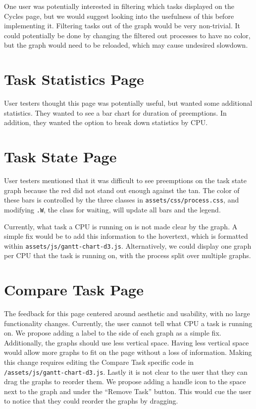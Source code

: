 \documentclass{hmcclinic}
\begin{document}
  One user was potentially interested in filtering which tasks displayed on the 
  Cycles page, but we would suggest looking into the usefulness of this before 
  implementing it. Filtering tasks out of the graph would be very non-trivial. 
  It could potentially be done by changing the filtered out processes to have 
  no color, but the graph would need to be reloaded, which may cause undesired 
  slowdown.

  \section{Task Statistics Page}

  User testers thought this page was potentially useful, but wanted some 
  additional statistics. They wanted to see a bar chart for duration of 
  preemptions. In addition, they wanted the option to break down statistics 
  by CPU.

  \section{Task State Page}

  User testers mentioned that it was difficult to see preemptions on the 
  task state graph because the red did not stand out enough against the tan. 
  The color of these bars is controlled by the three classes in 
  \texttt{assets/css/process.css}, and modifying \texttt{.W}, the class for 
  waiting, will update all bars and the legend.

  Currently, what task a CPU is running on is not made clear by the graph. 
  A simple fix would be to add this information to the hovertext, which is 
  formatted within \texttt{assets/js/gantt-chart-d3.js}. Alternatively, we 
  could display one graph per CPU that the task is running on, with the 
  process split over multiple graphs.

  \section{Compare Task Page}
  The feedback for this page centered around aesthetic and usability, with no 
  large functionality changes. Currently, the user cannot tell what CPU a task 
  is running on. We propose adding a label to the side of each graph as a simple 
  fix. Additionally, the graphs should use less vertical space. Having less 
  vertical space would allow more graphs to fit on the page without a loss of 
  information. Making this change requires editing the Compare Task specific 
  code in \texttt{/assets/js/gantt-chart-d3.js}. Lastly it is not clear to the
   user that they can drag the graphs to reorder them. We propose adding a 
   handle icon to the space next to the graph and under the ``Remove Task'' 
   button. This would cue the user to notice that they could reorder the graphs 
   by dragging. 
\end{document}

